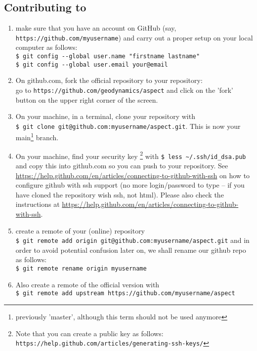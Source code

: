 
\subsection{Contributing to \aspect}

\begin{enumerate}
\item make sure that you  have an account on GitHub (say, \verb"https://github.com/myusername") 
and carry out a proper setup on your local computer as follows:\\
\verb'$ git config --global user.name "firstname lastname" '\\
\verb'$ git config --global user.email your@email'

\item On github.com, fork the official \aspect repository to your repository:\\
go to \verb"https://github.com/geodynamics/aspect"
and click on the 'fork' button on the upper right corner of the screen.

\item On your machine, in a terminal, clone your repository with \\
\verb"$ git clone git@github.com:myusername/aspect.git". 
This is now your main\footnote{previously 'master', although this term should not be used anymore} branch.

\item On your machine, find your security key \footnote{
Note that you can create a public key as follows: 
{\tt https://help.github.com/articles/generating-ssh-keys/}}
 with \verb"$ less ~/.ssh/id_dsa.pub" and copy this into github.com 
so you can push to your repository. See \url{https://help.github.com/en/articles/connecting-to-github-with-ssh} on how to configure github with ssh support (no more login/password to type -- if you have cloned the repository wish ssh, not html).
Please also check the instructions at \url{https://help.github.com/en/articles/connecting-to-github-with-ssh}.  
 
\item create a remote of your (online) repository\\
\verb"$ git remote add origin git@github.com:myusername/aspect.git"
and in order to avoid potential confusion later on, we shall rename our github repo as follows:\\
\verb"$ git remote rename origin myusername" 

\item Also create a remote of the official version with\\
\verb"$ git remote add upstream https://github.com/myusername/aspect"


\end{enumerate}
